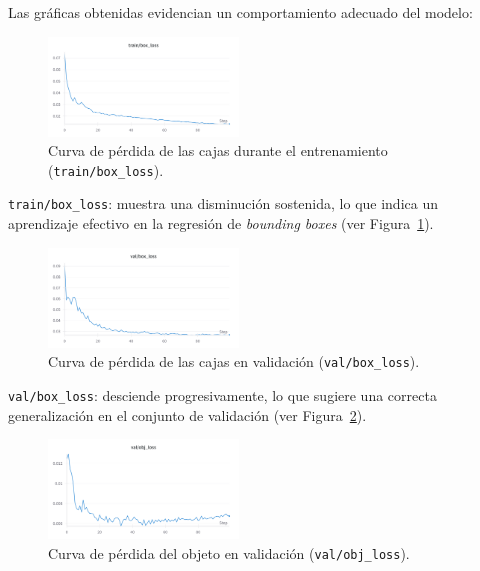 \documentclass[conference]{IEEEtran}
\begin{document}
Las gráficas obtenidas evidencian un comportamiento adecuado del modelo:



\begin{figure}[h]
\centering
\includegraphics[width=0.45\textwidth]{figs/plate_train_box_loss.png}
\caption{Curva de pérdida de las cajas durante el entrenamiento (\texttt{train/box\_loss}).}
\label{fig:plate_train_box_loss}
\end{figure}
\texttt{train/box\_loss}: muestra una disminución sostenida, lo que indica un aprendizaje efectivo en la regresión de \textit{bounding boxes} (ver Figura~\ref{fig:plate_train_box_loss}).


\begin{figure}[h]
\centering
\includegraphics[width=0.45\textwidth]{figs/plate_val_box_loss.png}
\caption{Curva de pérdida de las cajas en validación (\texttt{val/box\_loss}).}
\label{fig:plate_val_box_loss}
\end{figure}
\texttt{val/box\_loss}: desciende progresivamente, lo que sugiere una correcta generalización en el conjunto de validación (ver Figura~\ref{fig:plate_val_box_loss}).



\begin{figure}[h]
\centering
\includegraphics[width=0.45\textwidth]{figs/plate_val_obj_loss.png}
\caption{Curva de pérdida del objeto en validación (\texttt{val/obj\_loss}).}
\label{fig:plate_val_obj_loss}
\end{figure}
\end{document}
